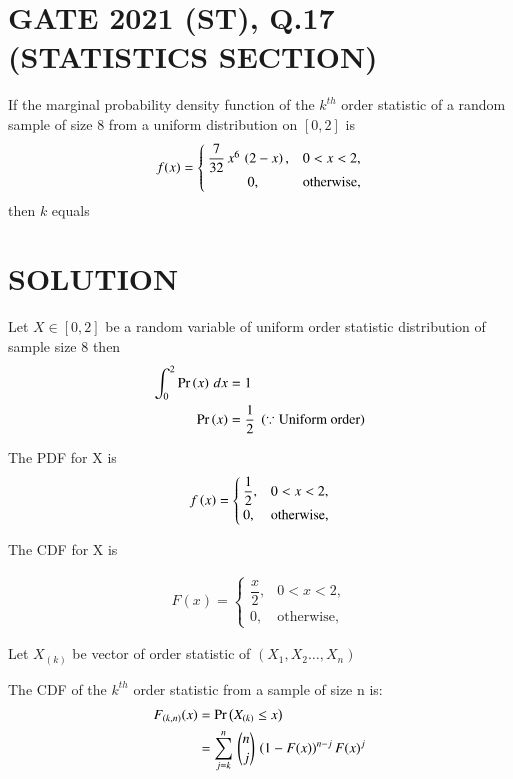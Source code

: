 \documentclass[journal,12pt,twocolumn]{IEEEtran}
\begin{document}
\section{GATE 2021 (ST), Q.17 (STATISTICS SECTION)} 
If the marginal probability density function of the $k^{th}$ order statistic of a 
random sample of size 8 from a uniform distribution on $[0,2]$ is
\[
  f(x) =
  \begin{cases}
   \dfrac{7}{32}\,x^{6}\,\left(2-x\right),  & 0<x<2, \\ 
      \hspace{1cm}   0,               & \text{otherwise,} 
  \end{cases}
\]
then $k$ equals \underline{\hspace{3cm}}

\bigskip

\section{SOLUTION}
Let $X\in[0,2]$ be a random variable of uniform order statistic distribution of sample size 8 then
\begin{align}
 \int_{0}^{2} \Pr\left(x\right)\,dx &= 1 \\
 \Pr\left(x\right)                  &= \dfrac{1}{2}\;\left(\because \text{Uniform order}\right)
\end{align}

The PDF for X is 
\begin{align}
f\left(x\right) = 
 \begin{cases}
  \dfrac{1}{2},      &0<x<2, \\ 
     0, &\text{otherwise,}
 \end{cases} \label{d}
\end{align}

 The CDF for X is 
 
 \begin{align}
 F(x) = 
 \begin{cases}
  \dfrac{x}{2},      &0<x<2, \\ 
     0, &\text{otherwise,}
 \end{cases} \label{e}
 \end{align}
 
 Let $X_{(k)}$ be vector of order statistic of $(X_1,X_2\dots,X_n)$ 
 
 The CDF of the $k^{th}$ order statistic from a sample of size n is:
\begin{align}
\nonumber F_{(k,n)}(x) &= \Pr\left(X_{(k)}\leq x\right) \\
                       &= \displaystyle\sum_{j=k}^{n}\,{n\choose j}\,\left(1-F(x)\right)^{n-j} F(x)^{j}
\end{align}
 
\end{document}
